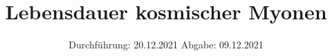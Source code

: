 
\setlength\parindent{0pt}
\subject{V01}
\title{Lebensdauer kosmischer Myonen}
\date{%
  Durchführung: 20.12.2021
  \hspace{3em}
  Abgabe: 09.12.2021 \\
}



\maketitle
\thispagestyle{empty}
\tableofcontents
\newpage







\newpage
\nocite{*}
\printbibliography
\appendix


